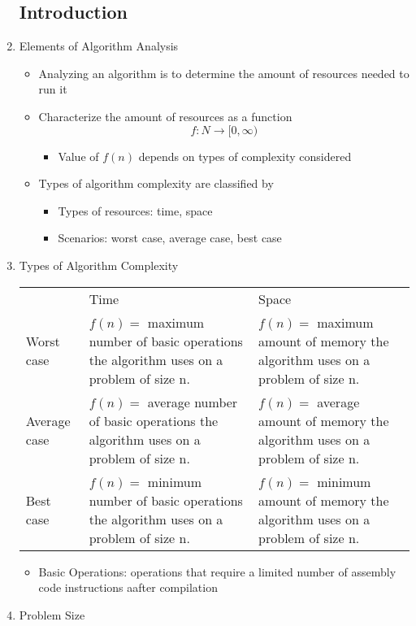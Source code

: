 \begin{enumerate}
\subsection{Introduction}
\item Elements of Algorithm Analysis
  \begin{itemize}
  \item Analyzing an algorithm is to determine the amount of resources needed to run it
  \item Characterize the amount of resources as a function $$f:N\rightarrow[0,\infty)$$
    \begin{itemize}
    \item Value of $f(n)$ depends on types of complexity considered
    \end{itemize}
  \item Types of algorithm complexity are classified by
    \begin{itemize}
    \item Types of resources: time, space
    \item Scenarios: worst case, average case, best case
    \end{itemize}
  \end{itemize}
\item Types of Algorithm Complexity \\
\begin{tabular}{p{2cm} p{5cm} p{5cm}}
\rowcolor{LightCyan} & Time & Space \\
\rowcolor{DarkCyan} Worst case & $f(n)=$ maximum number of basic operations the algorithm uses on a problem of size n. & $f(n)=$ maximum amount of memory the algorithm uses on a problem of size n. \\
\rowcolor{LightCyan}  Average case & $f(n)=$ average number of basic operations the algorithm uses on a problem of size n. & $f(n)=$ average amount of memory the algorithm uses on a problem of size n. \\
\rowcolor{DarkCyan}  Best case & $f(n)=$ minimum number of basic operations the algorithm uses on a problem of size n. & $f(n)=$ minimum amount of memory the algorithm uses on a problem of size n. \\
\end{tabular}
  \begin{itemize}
  \item Basic Operations: operations that require a limited number of assembly code instructions aafter compilation
  \end{itemize}
\item Problem Size

\end{enumerate}
